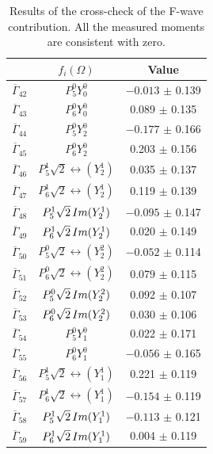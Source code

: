 \begin{table}[!htb]
\centering
\begin{tabular}{l|c|c}
& $f_{i}(\Omega)$ & Value \\
\hline
$\overline{\Gamma}_{42}$ & $P_{5}^{0}Y_{0}^{0}$ & $-0.013$ $\pm$ 0.139 \\ 
$\overline{\Gamma}_{43}$ & $P_{6}^{0}Y_{0}^{0}$ & \hphantom{$-$}0.089 $\pm$ 0.135 \\ 
$\overline{\Gamma}_{44}$ & $P_{5}^{0}Y_{2}^{0}$ & $-0.177$ $\pm$ 0.166 \\ 
$\overline{\Gamma}_{45}$ & $P_{6}^{0}Y_{2}^{0}$ & \hphantom{$-$}0.203 $\pm$ 0.156 \\ 
$\overline{\Gamma}_{46}$ & $P_{5}^{1}\sqrt{2}\rel(Y_{2}^{1})$ & \hphantom{$-$}0.035 $\pm$ 0.137 \\ 
$\overline{\Gamma}_{47}$ & $P_{6}^{1}\sqrt{2}\rel(Y_{2}^{1})$ & \hphantom{$-$}0.119 $\pm$ 0.139 \\ 
$\overline{\Gamma}_{48}$ & $P_{5}^{1}\sqrt{2}\, Im(Y_{2}^{1})$ & $-0.095$ $\pm$ 0.147 \\ 
$\overline{\Gamma}_{49}$ & $P_{6}^{1}\sqrt{2}\, Im(Y_{2}^{1})$ & \hphantom{$-$}0.020 $\pm$ 0.149 \\ 
$\overline{\Gamma}_{50}$ & $P_{5}^{0}\sqrt{2}\rel(Y_{2}^{2})$ & $-0.052$ $\pm$ 0.114 \\ 
$\overline{\Gamma}_{51}$ & $P_{6}^{0}\sqrt{2}\rel(Y_{2}^{2})$ & \hphantom{$-$}0.079 $\pm$ 0.115 \\ 
$\overline{\Gamma}_{52}$ & $P_{5}^{0}\sqrt{2}\, Im(Y_{2}^{2})$ & \hphantom{$-$}0.092 $\pm$ 0.107 \\ 
$\overline{\Gamma}_{53}$ & $P_{6}^{0}\sqrt{2}\, Im(Y_{2}^{2})$ & \hphantom{$-$}0.030 $\pm$ 0.106 \\ 
$\overline{\Gamma}_{54}$ & $P_{5}^{0}Y_{1}^{0}$ & \hphantom{$-$}0.022 $\pm$ 0.171 \\ 
$\overline{\Gamma}_{55}$ & $P_{6}^{0}Y_{1}^{0}$ & $-0.056$ $\pm$ 0.165 \\ 
$\overline{\Gamma}_{56}$ & $P_{5}^{1}\sqrt{2}\rel(Y_{1}^{1})$ & \hphantom{$-$}0.221 $\pm$ 0.119 \\ 
$\overline{\Gamma}_{57}$ & $P_{6}^{1}\sqrt{2}\rel(Y_{1}^{1})$ & $-0.154$ $\pm$ 0.119 \\ 
$\overline{\Gamma}_{58}$ & $P_{5}^{1}\sqrt{2}\, Im(Y_{1}^{1})$ & $-0.113$ $\pm$ 0.121 \\ 
$\overline{\Gamma}_{59}$ & $P_{6}^{1}\sqrt{2}\, Im(Y_{1}^{1})$ & \hphantom{$-$}0.004 $\pm$ 0.119 \\ 
\end{tabular}
\caption{Results of the cross-check of the F-wave contribution. All the measured moments are consistent with zero.}
\label{fig:kpimm:angular-analysis:f-wave:tab}
\end{table}

